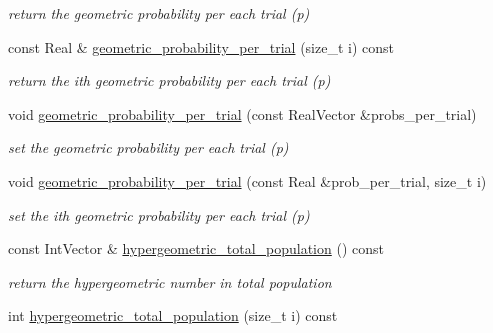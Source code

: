 \begin{DoxyCompactItemize}
\begin{DoxyCompactList}\small\item\em return the geometric probability per each trial (p) \end{DoxyCompactList}\item 
const Real \& \hyperlink{classPecos_1_1AleatoryDistParams_af6142df6d38d3d3defcca72194f2e526}{geometric\+\_\+probability\+\_\+per\+\_\+trial} (size\+\_\+t i) const \label{classPecos_1_1AleatoryDistParams_af6142df6d38d3d3defcca72194f2e526}

\begin{DoxyCompactList}\small\item\em return the ith geometric probability per each trial (p) \end{DoxyCompactList}\item 
void \hyperlink{classPecos_1_1AleatoryDistParams_a9a605220fa5256e11871402bddd80efc}{geometric\+\_\+probability\+\_\+per\+\_\+trial} (const Real\+Vector \&probs\+\_\+per\+\_\+trial)\label{classPecos_1_1AleatoryDistParams_a9a605220fa5256e11871402bddd80efc}

\begin{DoxyCompactList}\small\item\em set the geometric probability per each trial (p) \end{DoxyCompactList}\item 
void \hyperlink{classPecos_1_1AleatoryDistParams_a23b24153af77175a350cddb380a0c3e6}{geometric\+\_\+probability\+\_\+per\+\_\+trial} (const Real \&prob\+\_\+per\+\_\+trial, size\+\_\+t i)\label{classPecos_1_1AleatoryDistParams_a23b24153af77175a350cddb380a0c3e6}

\begin{DoxyCompactList}\small\item\em set the ith geometric probability per each trial (p) \end{DoxyCompactList}\item 
const Int\+Vector \& \hyperlink{classPecos_1_1AleatoryDistParams_a92fc7753e183f44111bdd76d93cedce0}{hypergeometric\+\_\+total\+\_\+population} () const \label{classPecos_1_1AleatoryDistParams_a92fc7753e183f44111bdd76d93cedce0}

\begin{DoxyCompactList}\small\item\em return the hypergeometric number in total population \end{DoxyCompactList}\item 
int \hyperlink{classPecos_1_1AleatoryDistParams_a91619ba6216602ae3710e63f0680ccf5}{hypergeometric\+\_\+total\+\_\+population} (size\+\_\+t i) const \label{classPecos_1_1AleatoryDistParams_a91619ba6216602ae3710e63f0680ccf5}


\end{DoxyCompactItemize}
